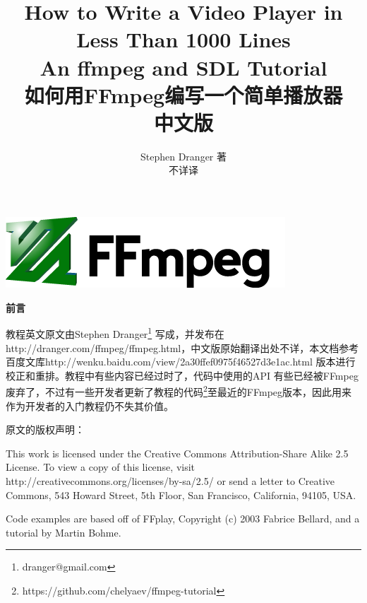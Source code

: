\documentclass[12pt,a4paper,landscape,fancyhdr,fntef,oneside]{ctexbook}
\title{
\hfill{\small \textbf{How to Write a Video Player in
Less Than 1000 Lines}}\\
\hfill \textbf{An ffmpeg and SDL Tutorial}\\
\hfill \textbf{如何用FFmpeg编写一个简单播放器}\\
\hfill {\large\kaishu 中文版}}
\author{
		\hfill Stephen Dranger \quad 著\\	
		\hfill 不详\quad 译\\	
}
\makeatletter
\renewenvironment{quote}
                {\kaishu
                 \list{}{\rightmargin   2em
                         \listparindent 2em
                         \itemindent    2em
                         \parsep        0em}
                 \item\relax}
                {\endlist}
\def\printtitle{%
    {\huge {\@title}\par}}		%
\def\printauthor{%
    {\large \@author}}				%
\renewcommand\maketitle{%
  \newpage
  \thispagestyle{empty}

	
	\includegraphics[height=0.1314\textheight]{FFmpegnewlogo.png}\\	%

%
%
\begin{minipage}{\linewidth}
\begin{flushleft}
\vspace{.2\textheight}
\printtitle
\vspace{.2\textheight}
\printauthor
\end{flushleft}
\end{minipage}
\clearpage}
\makeatother
\begin{document}
\maketitle

\newpage
\thispagestyle{empty}
{\hfil \huge \textbf{前\hspace{2em}言}}\par
\vspace{.1\textheight}

教程英文原文由Stephen Dranger\footnote{dranger@gmail.com} 写成，并发布在http://dranger.com/ffmpeg/ffmpeg.html，中文版原始翻译出处不详，本文档参考百度文库http://wenku.baidu.com/view/2a30ffef0975f46527d3e1ac.html 版本进行校正和重排。教程中有些内容已经过时了，代码中使用的API 有些已经被FFmpeg废弃了，不过有一些开发者更新了教程的代码\footnote{https://github.com/chelyaev/ffmpeg-tutorial}至最近的FFmpeg版本，因此用来作为开发者的入门教程仍不失其价值。

\vspace{1em}
原文的版权声明：
\begin{quote}
\noindent This work is licensed under the Creative Commons Attribution-Share Alike 2.5 License. To view a copy of this license, visit http://creativecommons.org/licenses/by-sa/2.5/ or send a letter to Creative Commons, 543 Howard Street, 5th Floor, San Francisco, California, 94105, USA.

\noindent Code examples are based off of FFplay, Copyright (c) 2003 Fabrice Bellard, and a tutorial by Martin Bohme.
\end{quote}


\frontmatter
\tableofcontents

\mainmatter














\end{document}
